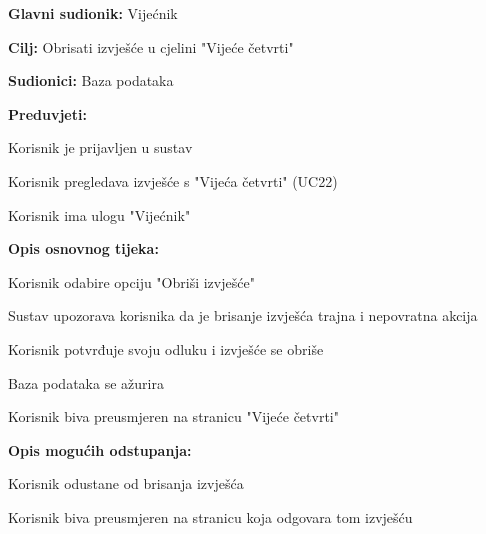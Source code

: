 					\noindent {}
					\begin{packed_item}
	
						\item \textbf{Glavni sudionik: }Vijećnik
						\item  \textbf{Cilj:} Obrisati izvješće u cjelini "Vijeće četvrti"
						\item  \textbf{Sudionici:} Baza podataka
						\item  \textbf{Preduvjeti:}
						\item[] \begin{packed_enum}
							\item Korisnik je prijavljen u sustav
							\item Korisnik pregledava izvješće s "Vijeća četvrti" (UC22)
							\item Korisnik ima ulogu "Vijećnik"														\end{packed_enum}
						\item  \textbf{Opis osnovnog tijeka:}
						
						\item[] \begin{packed_enum}
	
							\item Korisnik odabire opciju "Obriši izvješće"
							\item Sustav upozorava korisnika da je brisanje izvješća trajna i nepovratna akcija
							\item Korisnik potvrđuje svoju odluku i izvješće se obriše
							\item Baza podataka se ažurira
							\item Korisnik biva preusmjeren na stranicu "Vijeće četvrti"
						\end{packed_enum}
						
						\item  \textbf{Opis mogućih odstupanja:}
						
						\item[] \begin{packed_item}
	
							\item[3.a] Korisnik odustane od brisanja izvješća
							\item[] \begin{packed_enum}
								
								\item Korisnik biva preusmjeren na stranicu koja odgovara tom izvješću
								
							\end{packed_enum}
							
						\end{packed_item}
					\end{packed_item}
						
